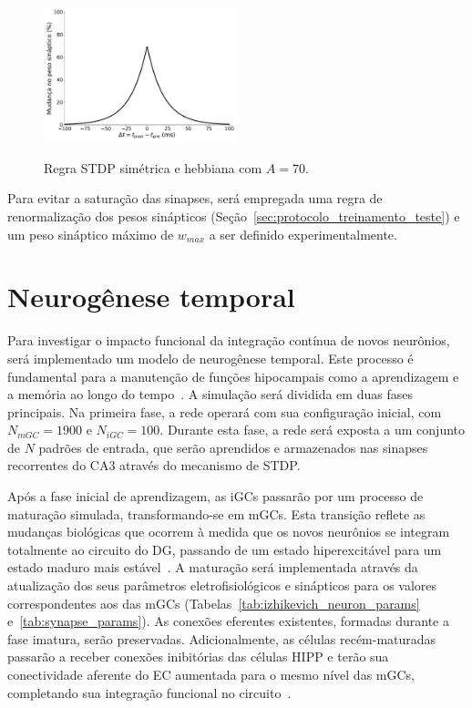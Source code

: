 \begin{figure}[H]
    \centering
    \caption{Regra STDP simétrica e hebbiana com $A = 70$.}
    \includegraphics[width=0.5\textwidth]{figuras/symmetric_stdp}
    \label{fig:symmetric_stdp}
\end{figure}

Para evitar a saturação das sinapses, será empregada uma regra de renormalização dos pesos sinápticos
(Seção~\ref{sec:protocolo_treinamento_teste}) e um peso sináptico máximo de $w_{max}$ a ser definido experimentalmente.

\section{Neurogênese temporal}

Para investigar o impacto funcional da integração contínua de novos neurônios, será implementado um modelo de neurogênese
temporal. Este processo é fundamental para a manutenção de funções hipocampais como a aprendizagem e a memória ao longo do
tempo~\cite{aimoneRegulation2014, berdugo-vegaSharpening2023}. A simulação será dividida em duas fases principais. Na primeira
fase, a rede operará com sua configuração inicial, com $N_{mGC} = 1900$ e $N_{iGC} = 100$. Durante esta fase, a rede será exposta
a um conjunto de $N$ padrões de entrada, que serão aprendidos e armazenados nas sinapses recorrentes do CA3 através do mecanismo
de STDP.

Após a fase inicial de aprendizagem, as iGCs passarão por um processo de maturação simulada, transformando-se em mGCs. Esta
transição reflete as mudanças biológicas que ocorrem à medida que os novos neurônios se integram totalmente ao circuito do DG,
passando de um estado hiperexcitável para um estado maduro mais estável~\cite{abbottAdult2020}. A maturação será implementada
através da atualização dos seus parâmetros eletrofisiológicos e sinápticos para os valores correspondentes aos das mGCs
(Tabelas~\ref{tab:izhikevich_neuron_params} e~\ref{tab:synapse_params}). As conexões eferentes existentes, formadas durante a fase
imatura, serão preservadas. Adicionalmente, as células recém-maturadas passarão a receber conexões inibitórias das células HIPP e
terão sua conectividade aferente do EC aumentada para o mesmo nível das mGCs, completando sua integração funcional no
circuito~\cite{lunaAdultborn2019}.

